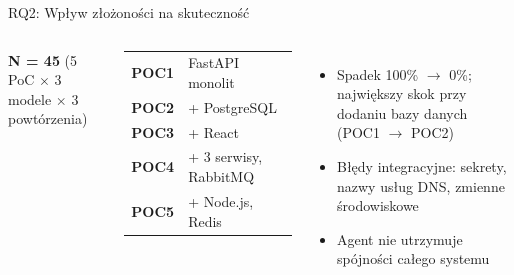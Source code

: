 \documentclass[aspectratio=169]{beamer}
\begin{document}
\begin{frame}{RQ2: Wpływ złożoności na skuteczność}
    \begin{columns}[T]

        \textbf{N = 45} (5 PoC $\times$ 3 modele $\times$ 3 powtórzenia)
        \vspace{0.3em}
        {\small
        \begin{tabular}{@{}ll@{}}
            \textbf{POC1} & FastAPI monolit \\
            \textbf{POC2} & + PostgreSQL \\
            \textbf{POC3} & + React \\
            \textbf{POC4} & + 3 serwisy, RabbitMQ \\
            \textbf{POC5} & + Node.js, Redis \\
        \end{tabular}}
        \vspace{0.4em}
        \begin{itemize}
            \item Spadek 100\% $\to$ 0\%; największy skok przy dodaniu bazy danych (POC1 $\to$ POC2)
            \item Błędy integracyjne: sekrety, nazwy usług DNS, zmienne środowiskowe
            \item Agent nie utrzymuje spójności całego systemu
        \end{itemize}
    \end{columns}
\end{frame}
\end{document}
